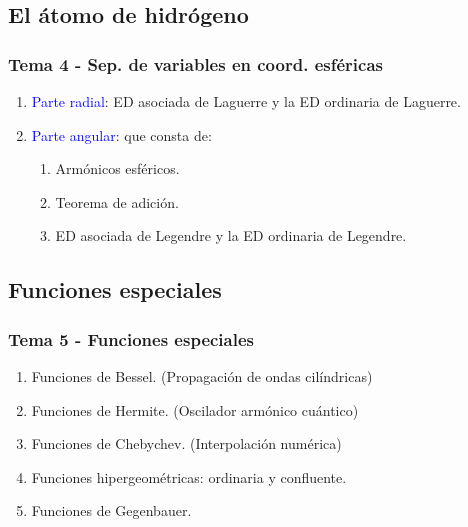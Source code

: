 \documentclass[12pt]{beamer}
\begin{document}
\subsection{El átomo de hidrógeno}

\begin{frame}
\frametitle{Tema 4 - Sep. de variables en coord. esféricas}
\begin{enumerate}[<+->]
\item \textcolor{blue}{Parte radial}: ED asociada de Laguerre y la ED ordinaria de Laguerre.
\item \textcolor{blue}{Parte angular}: que consta de:
\begin{enumerate}
  \item[2.1] Armónicos esféricos.
  \item[2.2] Teorema de adición.
  \item[2.3] ED asociada de Legendre y la ED ordinaria de Legendre.
\end{enumerate}
\end{enumerate}
\end{frame}

\subsection{Funciones especiales}

\begin{frame}
\frametitle{Tema 5 - Funciones especiales}
\begin{enumerate}[<+->]
\item Funciones de Bessel. (Propagación de ondas cilíndricas)
\item Funciones de Hermite. (Oscilador armónico cuántico)
\item Funciones de Chebychev. (Interpolación numérica)
\item Funciones hipergeométricas: ordinaria y confluente.
\item Funciones de Gegenbauer.
\end{enumerate}
\end{frame}
\end{document}
